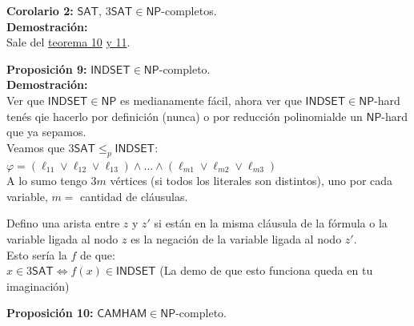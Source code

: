 \documentclass{article}
\begin{document}
\begin{flushleft}
  \textbf{Corolario 2:}
  $\mathsf{SAT}$, $3\mathsf{SAT} \in \mathsf{NP}$-completos. \\[0.5em]

  \textbf{\textcolor{Mulberry}{Demostración:}} \\[0.5em]

  Sale del \textcolor{Rhodamine}{\hyperlink{teo10}{teorema 10} \hyperlink{cooklevin}{y 11}}.
\end{flushleft}

\begin{flushleft}
  \textbf{Proposición 9:}
  $\mathsf{INDSET} \in \mathsf{NP}$-completo. \\[0.5em]

  \textbf{\textcolor{Mulberry}{Demostración:}} \\[0.5em]

  Ver que $\mathsf{INDSET} \in \mathsf{NP}$ es medianamente fácil, ahora ver que $\mathsf{INDSET} \in 
  \mathsf{NP}$-hard tenés qie hacerlo por definición \textcolor{OliveGreen}{(nunca)} o por reducción 
  polinomialde un $\mathsf{NP}$-hard que ya sepamos. \\[0.5em]

  Veamos que $3\mathsf{SAT} \leq_p \mathsf{INDSET}$:\\[0.5em]

  \qquad $\varphi = (\ell_{11} \lor \ell_{12} \lor \ell_{13}) \land \dots \land (\ell_{m1} \lor \ell_{m2}
  \lor \ell_{m3})$ \\[0.5em]

  A lo sumo tengo $3m$ vértices (si todos los literales son distintos), uno por cada variable, $m =$ cantidad de 
  cláusulas.

  Defino una arista entre $z$ y $z'$ si están en la misma cláusula de la fórmula o la variable ligada al
  nodo $z$ es la negación de la variable ligada al nodo $z'$. \\[0.5em]

  Esto sería la $f$ de que: \\[0.5em]

  \qquad $x \in 3\mathsf{SAT} \iff f(x) \in \mathsf{INDSET}$ \qquad \textcolor{OliveGreen}{(La demo de que
  esto funciona queda en tu imaginación)}
\end{flushleft}

\begin{flushleft}
  \textbf{Proposición 10:}
  $\mathsf{CAMHAM} \in \mathsf{NP}$-completo.
\end{flushleft}
\end{document}
